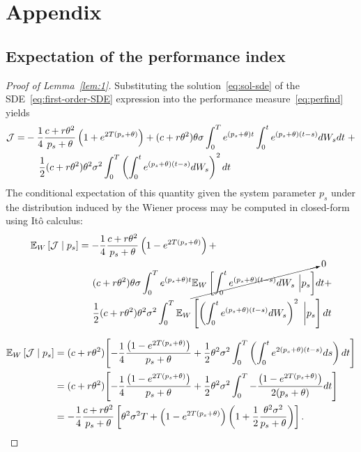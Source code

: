 \chapter*{Appendix}
\appendix
\label{ch:appendix}

\section*{Expectation of the performance index}
\label{sec:app_expectation}

\begin{proof}[Proof of Lemma~\ref{lem:1}]
%
Substituting the solution~\eqref{eq:sol-sde} of the
SDE~\eqref{eq:first-order-SDE} expression into the performance
measure~\eqref{eq:perfind} yields
%
\begin{align*} \mathcal{J} =
        & -\frac{1}{4}\frac{c+r\theta^2}{p_s+\theta}\left(1 +
        e^{2T(p_s+\theta)}\right) + 
        (c+r\theta^2)\theta\sigma \int_0^T
        e^{(p_s+\theta)t} \int_0^t e^{(p_s+\theta)(t-s)}dW_s
        dt \; + \\ & \hspace{0.5cm}\frac{1}{2}(c+r\theta^2)\theta^2
        \sigma^2 \int_0^T \left( \int_0^t
        e^{(p_s+\theta)(t-s)} dW_s  \right)^2 dt 
\end{align*}
%
The conditional expectation of this quantity given the system parameter $p_s$
under the distribution induced by the Wiener process may be computed in
closed-form using It\^{o} calculus:
%
\begin{align*} 
\mathbb{E}_W\left[\mathcal{J} \mid p_s \right]
        &= -\frac{1}{4}\frac{c+r\theta^2}{p_s+\theta}\left(1 -
        e^{2T(p_s+\theta)}\right) + \\
        &\hspace{0.5cm} (c+r\theta^2)\theta\sigma\int_0^Te^{(p_s+\theta)t}\cancelto{0}{\mathbb{E}_W\left[\int_0^t
        e^{(p_s+\theta)(t-s)} dW_s~\Big\rvert p_s\right]} dt + \\
        & \hspace{0.5cm} \frac{1}{2}(c+r\theta^2)\theta^2\sigma^2\int_0^T\mathbb{E}_W\left[\left(\int_0^t
        e^{(p_s+\theta)(t-s)} dW_s \right)^2~\bigg\rvert p_s\right] dt 
\end{align*}

\begin{align*}
        \mathbb{E}_W\left[\mathcal{J} \mid p_s \right]&=(c+r\theta^2) \Biggl[-\frac{1}{4}\frac{\left(1 -
        e^{2T(p_s+\theta)} \right)}{p_s+\theta} + 
        \frac{1}{2}\theta^2\sigma^2\int_0^T\left(\int_0^t
        e^{2(p_s+\theta)(t-s)} ds \right) dt \Biggr] \\ 
        &=(c+r\theta^2) \Biggl[-\frac{1}{4}\frac{\left(1 - e^{2T(p_s+\theta)}\right)}{p_s+\theta} + 
        \frac{1}{2}\theta^2\sigma^2\int_0^T
        -\frac{\left(1 - e^{2T(p_s+\theta)}\right)}{2(p_s+\theta)} dt \Biggr]\\ 
        &=-\frac{1}{4}\frac{c+r\theta^2}{p_s+\theta} \left[ \theta^2 \sigma^2 T +
        \left(1 - e^{2T(p_s+\theta)}\right) \left(1 +
        \frac{1}{2}\frac{\theta^2\sigma^2}{p_s+\theta}\right)\right]. 
\end{align*}
        
%
\end{proof}

